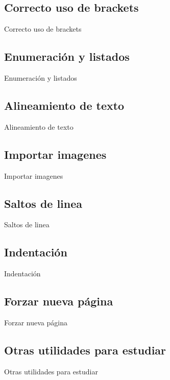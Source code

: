 \documentclass[../slides.tex]{subfiles}
\begin{document}
    \subsection{Correcto uso de brackets}
    \begin{frame}{Correcto uso de brackets}
    
    \end{frame}
    
    \subsection{Enumeración y listados}
    \begin{frame}{Enumeración y listados}
        
    \end{frame}
    
    \subsection{Alineamiento de texto}
    \begin{frame}{Alineamiento de texto}
        
    \end{frame}

    \subsection{Importar imagenes}
    \begin{frame}{Importar imagenes}
        
    \end{frame}
    
    \subsection{Saltos de linea}
    \begin{frame}{Saltos de linea}
        
    \end{frame}
    
    \subsection{Indentación}
    \begin{frame}{Indentación}
        
    \end{frame}
    
    \subsection{Forzar nueva página}
    \begin{frame}{Forzar nueva página}
    
    \end{frame}
    
    \subsection{Otras utilidades para estudiar}
    
    \begin{frame}{Otras utilidades para estudiar}
    \end{frame}
    
\end{document}
